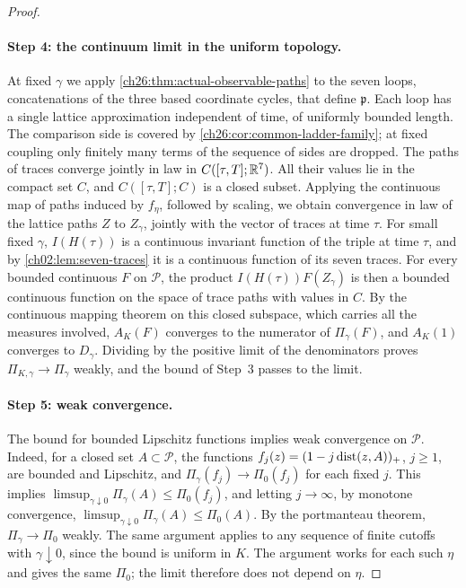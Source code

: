 \begin{proof}
\paragraph{Step 4: the continuum limit in the uniform topology.}
At fixed $\gamma$ we apply \cref{ch26:thm:actual-observable-paths} to the seven loops, concatenations of the three based coordinate cycles, that define $\mathfrak p$. Each loop has a single lattice approximation independent of time, of uniformly bounded length. The comparison side is covered by \cref{ch26:cor:common-ladder-family}; at fixed coupling only finitely many terms of the sequence of sides are dropped. The paths of traces converge jointly in law in $C([\tau,T];\mathbb R^7)$. All their values lie in the compact set $C$, and $C([\tau,T];C)$ is a closed subset. Applying the continuous map of paths induced by $f_\eta$, followed by scaling, we obtain convergence in law of the lattice paths $Z$ to $Z_\gamma$, jointly with the vector of traces at time $\tau$. For small fixed $\gamma$, $I(H(\tau))$ is a continuous invariant function of the triple at time $\tau$, and by \cref{ch02:lem:seven-traces} it is a continuous function of its seven traces. For every bounded continuous $F$ on $\mathscr P$, the product $I(H(\tau))F(Z_\gamma)$ is then a bounded continuous function on the space of trace paths with values in $C$. By the continuous mapping theorem on this closed subspace, which carries all the measures involved, $A_K(F)$ converges to the numerator of $\Pi_\gamma(F)$, and $A_K(1)$ converges to $D_\gamma$. Dividing by the positive limit of the denominators proves $\Pi_{K,\gamma}\to\Pi_\gamma$ weakly, and the bound of Step~3 passes to the limit.

\paragraph{Step 5: weak convergence.}
The bound for bounded Lipschitz functions implies weak convergence on $\mathscr P$. Indeed, for a closed set $A\subset\mathscr P$, the functions $f_j(z)=(1-j\operatorname{dist}(z,A))_+$, $j\ge1$, are bounded and Lipschitz, and $\Pi_\gamma(f_j)\to\Pi_0(f_j)$ for each fixed $j$. This implies $\limsup_{\gamma\downarrow0}\Pi_\gamma(A)\le\Pi_0(f_j)$, and letting $j\to\infty$, by monotone convergence, $\limsup_{\gamma\downarrow0}\Pi_\gamma(A)\le\Pi_0(A)$. By the portmanteau theorem, $\Pi_\gamma\to\Pi_0$ weakly. The same argument applies to any sequence of finite cutoffs with $\gamma\downarrow0$, since the bound is uniform in $K$. The argument works for each such $\eta$ and gives the same $\Pi_0$; the limit therefore does not depend on $\eta$.
\end{proof}

